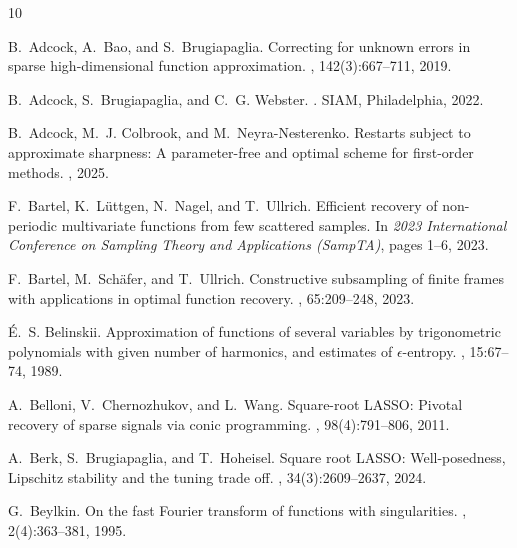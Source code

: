 \documentclass[11pt,reqno, a4paper]{article}
\numberwithin{equation}{section}
\begin{document}

\fontsize{11}{11}\selectfont


\begin{thebibliography}{10}

B.~Adcock, A.~Bao, and S.~Brugiapaglia.
\newblock Correcting for unknown errors in sparse high-dimensional function
  approximation.
, 142(3):667--711, 2019.

B.~Adcock, S.~Brugiapaglia, and C.~G. Webster.
.
\newblock SIAM, Philadelphia, 2022.

B.~Adcock, M.~J. Colbrook, and M.~Neyra-Nesterenko.
\newblock Restarts subject to approximate sharpness: A parameter-free and
  optimal scheme for first-order methods.
, 2025.

F.~Bartel, K.~Lüttgen, N.~Nagel, and T.~Ullrich.
\newblock Efficient recovery of non-periodic multivariate functions from few
  scattered samples.
\newblock In {\em 2023 International Conference on Sampling Theory and
  Applications (SampTA)}, pages 1--6, 2023.

F.~Bartel, M.~Sch\"{a}fer, and T.~Ullrich.
\newblock Constructive subsampling of finite frames with applications in
  optimal function recovery.
, 65:209--248, 2023.

{\'E}.~S. Belinskii.
\newblock Approximation of functions of several variables by trigonometric
  polynomials with given number of harmonics, and estimates of
  $\epsilon$-entropy.
, 15:67--74, 1989.

A.~Belloni, V.~Chernozhukov, and L.~Wang.
\newblock Square-root {LASSO}: Pivotal recovery of sparse signals via conic
  programming.
, 98(4):791--806, 2011.

A.~Berk, S.~Brugiapaglia, and T.~Hoheisel.
\newblock Square root {LASSO}: Well-posedness, {L}ipschitz stability and the
  tuning trade off.
, 34(3):2609--2637, 2024.

G.~Beylkin.
\newblock On the fast {F}ourier transform of functions with singularities.
, 2(4):363--381,
  1995.


\end{thebibliography}
\end{document}
